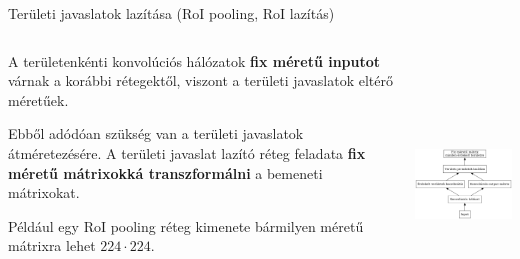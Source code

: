 \documentclass[english, aspectratio=169]{beamer}
\begin{document}
	\begin{frame}{Területi javaslatok lazítása (RoI pooling, RoI lazítás)}
		\begin{columns}
			\begin{column}{.5\textwidth}
				A területenkénti konvolúciós hálózatok \textbf{fix méretű inputot} várnak a korábbi rétegektől, viszont a területi javaslatok eltérő méretűek.\par\smallskip
				Ebből adódóan szükség van a területi javaslatok átméretezésére. A területi javaslat lazító réteg feladata \textbf{fix méretű mátrixokká transzformálni} a bemeneti mátrixokat.\par\smallskip
				Például egy RoI pooling réteg kimenete bármilyen méretű mátrixra lehet $224 \cdot 224$.
			\end{column}
			\begin{column}{.5\textwidth}
				\begin{center}
					\includegraphics[height=7cm, width=7cm, keepaspectratio]{graphs/od_6.png}
				\end{center}
			\end{column}
		\end{columns}
	\end{frame}
	
\end{document}
